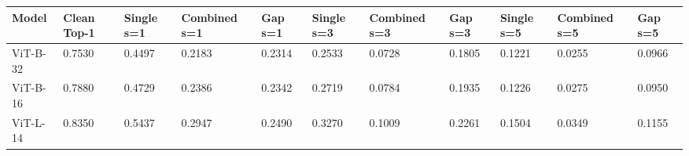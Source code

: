 \begin{tabular}{lllllllllll}
\toprule
Model & Clean Top-1 & Single s=1 & Combined s=1 & Gap s=1 & Single s=3 & Combined s=3 & Gap s=3 & Single s=5 & Combined s=5 & Gap s=5 \\
\midrule
ViT-B-32 & 0.7530 & 0.4497 & 0.2183 & 0.2314 & 0.2533 & 0.0728 & 0.1805 & 0.1221 & 0.0255 & 0.0966 \\
ViT-B-16 & 0.7880 & 0.4729 & 0.2386 & 0.2342 & 0.2719 & 0.0784 & 0.1935 & 0.1226 & 0.0275 & 0.0950 \\
ViT-L-14 & 0.8350 & 0.5437 & 0.2947 & 0.2490 & 0.3270 & 0.1009 & 0.2261 & 0.1504 & 0.0349 & 0.1155 \\
\bottomrule
\end{tabular}
